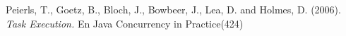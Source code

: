 \documentclass[twoside,twocolumn]{article}
\begin{document}



\begin{thebibliography}{99} %

Peierls, T., Goetz, B., Bloch, J., Bowbeer, J., Lea, D. and Holmes, D. (2006).
\newblock \textit{Task Execution.} 
En Java Concurrency in Practice(424)
 
\end{thebibliography}

\end{document}

